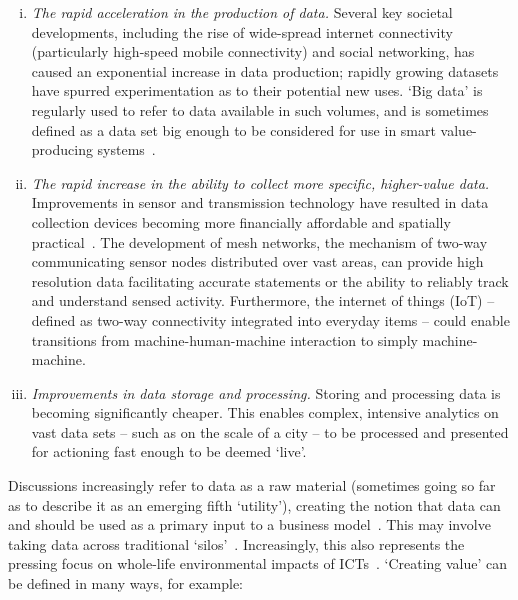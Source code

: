 \documentclass[b5paper,10pt]{article}
\begin{document}
\begin{enumerate}[i)]
\item {\emph{The rapid acceleration in the production of data.}}
Several key societal developments, including the rise of wide-spread
internet connectivity (particularly high-speed mobile connectivity)
and social networking, has caused an exponential increase in data
production; rapidly growing datasets have spurred experimentation as
to their potential new uses. `Big data' is regularly used to refer to
data available in such volumes, and is sometimes defined as a data set
big enough to be considered for use in smart value-producing
systems~\citep{ojo-et-al:2015,sta:2017,mckinseysmartcities:2018}.
\item {\emph{The rapid increase in the ability to collect more
specific, higher-value data.}} Improvements in sensor and transmission
technology have resulted in data collection devices becoming more
financially affordable and spatially
practical~\citep{townsend:2013}. The development of mesh networks, the
mechanism of two-way communicating sensor nodes distributed over vast
areas, can provide high resolution data facilitating accurate
statements or the ability to reliably track and understand sensed
activity. Furthermore, the internet of things (IoT) -- defined as
two-way connectivity integrated into everyday items -- could enable
transitions from machine-human-machine interaction to simply
machine-machine.
\item {\emph{Improvements in data storage and processing.}} Storing
and processing data is becoming significantly cheaper. This enables
complex, intensive analytics on vast data sets -- such as on the scale
of a city -- to be processed and presented for actioning fast enough
to be deemed `live'.
\end{enumerate}

Discussions increasingly refer to data as a raw material (sometimes
going so far as to describe it as an emerging fifth `utility'),
creating the notion that data can and should be used as a primary
input to a business model~\citep{arup-et-al:2011}. This may involve
taking data across traditional
`silos'~\citep{shapiro:2006,tsoukalas:2008}. Increasingly, this also
represents the pressing focus on whole-life environmental impacts of
ICTs~\citep{cooper-et-al-gsict:2015}. `Creating value' can be defined
in many ways, for example:
\end{document}
